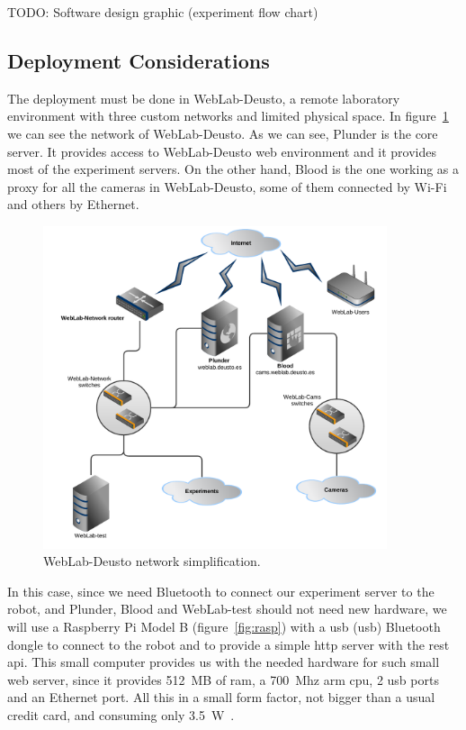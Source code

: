 TODO: Software design graphic (experiment flow chart)

\subsection{Deployment Considerations}

The deployment must be done in WebLab-Deusto, a remote laboratory environment with three custom
networks and limited physical space. In figure~\ref{fig:weblab-network} we can see the network of
WebLab-Deusto. As we can see, Plunder is the core server. It provides access to WebLab-Deusto web
environment and it provides most of the experiment servers. On the other hand, Blood is the one
working as a proxy for all the cameras in WebLab-Deusto, some of them connected by Wi-Fi and others
by Ethernet.

\begin{figure}[!htbp]
	\centering
	\includegraphics[width=0.9\textwidth]{fig/weblab-network}
	\caption{WebLab-Deusto network simplification.}\label{fig:weblab-network}
\end{figure}

In this case, since we need Bluetooth to connect our experiment server to the robot, and Plunder,
Blood and WebLab-test should not need new hardware, we will use a Raspberry Pi Model B
(figure~\ref{fig:rasp}) with a \acrshort{usb} (\acrlong{usb}) Bluetooth dongle to connect to the
robot and to provide a simple \acrshort{http} server with the \acrshort{rest} \acrshort{api}. This
small computer provides us with the needed hardware for such small web server, since it provides
512~MB of \acrshort{ram}, a 700~Mhz \acrshort{arm} \acrshort{cpu}, 2 \acrshort{usb} ports and an
Ethernet port. All this in a small form factor, not bigger than a usual credit card, and consuming
only 3.5~W~\cite{rasp_b}.

